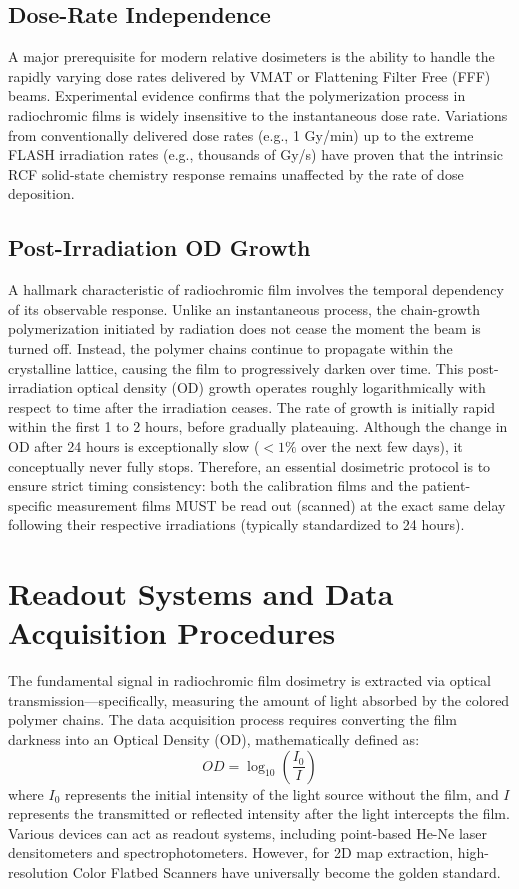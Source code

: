 \subsection{Dose-Rate Independence}
A major prerequisite for modern relative dosimeters is the ability to handle the rapidly varying dose rates delivered by VMAT or Flattening Filter Free (FFF) beams. Experimental evidence confirms that the polymerization process in radiochromic films is widely insensitive to the instantaneous dose rate. Variations from conventionally delivered dose rates (e.g., 1 Gy/min) up to the extreme FLASH irradiation rates (e.g., thousands of Gy/s) have proven that the intrinsic RCF solid-state chemistry response remains unaffected by the rate of dose deposition. 

\subsection{Post-Irradiation OD Growth}
A hallmark characteristic of radiochromic film involves the temporal dependency of its observable response. Unlike an instantaneous process, the chain-growth polymerization initiated by radiation does not cease the moment the beam is turned off. Instead, the polymer chains continue to propagate within the crystalline lattice, causing the film to progressively darken over time.
This post-irradiation optical density (OD) growth operates roughly logarithmically with respect to time after the irradiation ceases. The rate of growth is initially rapid within the first 1 to 2 hours, before gradually plateauing. Although the change in OD after 24 hours is exceptionally slow ($<1\%$ over the next few days), it conceptually never fully stops. Therefore, an essential dosimetric protocol is to ensure strict timing consistency: both the calibration films and the patient-specific measurement films MUST be read out (scanned) at the exact same delay following their respective irradiations (typically standardized to 24 hours). 

\section{Readout Systems and Data Acquisition Procedures}

The fundamental signal in radiochromic film dosimetry is extracted via optical transmission—specifically, measuring the amount of light absorbed by the colored polymer chains. The data acquisition process requires converting the film darkness into an Optical Density (OD), mathematically defined as:
\begin{equation}
    OD = \log_{10} \left( \frac{I_0}{I} \right)
\end{equation}
where $I_0$ represents the initial intensity of the light source without the film, and $I$ represents the transmitted or reflected intensity after the light intercepts the film.
Various devices can act as readout systems, including point-based He-Ne laser densitometers and spectrophotometers. However, for 2D map extraction, high-resolution Color Flatbed Scanners have universally become the golden standard.

